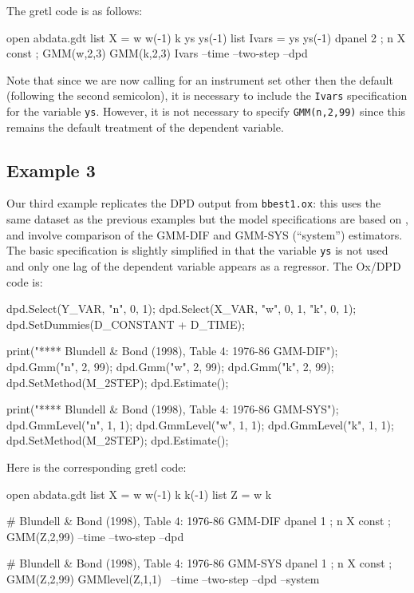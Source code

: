 The gretl code is as follows:

\begin{code}
open abdata.gdt
list X = w w(-1) k ys ys(-1)
list Ivars = ys ys(-1)
dpanel 2 ; n X const ; GMM(w,2,3) GMM(k,2,3) Ivars --time --two-step --dpd
\end{code}
%
Note that since we are now calling for an instrument set other then
the default (following the second semicolon), it is necessary to
include the \texttt{Ivars} specification for the variable \texttt{ys}.
However, it is not necessary to specify \texttt{GMM(n,2,99)} since
this remains the default treatment of the dependent variable.

\subsection{Example 3}

Our third example replicates the DPD output from \texttt{bbest1.ox}:
this uses the same dataset as the previous examples but the model
specifications are based on \cite{blundell-bond98}, and involve
comparison of the GMM-DIF and GMM-SYS (``system'') estimators. The
basic specification is slightly simplified in that the variable
\texttt{ys} is not used and only one lag of the dependent variable
appears as a regressor. The Ox/DPD code is:

\begin{code}
dpd.Select(Y_VAR, {"n", 0, 1});
dpd.Select(X_VAR, {"w", 0, 1, "k", 0, 1});
dpd.SetDummies(D_CONSTANT + D_TIME);

print("\n\n***** Blundell & Bond (1998), Table 4: 1976-86 GMM-DIF");
dpd.Gmm("n", 2, 99);
dpd.Gmm("w", 2, 99);
dpd.Gmm("k", 2, 99);
dpd.SetMethod(M_2STEP);
dpd.Estimate();

print("\n\n***** Blundell & Bond (1998), Table 4: 1976-86 GMM-SYS");
dpd.GmmLevel("n", 1, 1);
dpd.GmmLevel("w", 1, 1);
dpd.GmmLevel("k", 1, 1);
dpd.SetMethod(M_2STEP);
dpd.Estimate();
\end{code}

Here is the corresponding gretl code:

\begin{code}
open abdata.gdt
list X = w w(-1) k k(-1)
list Z = w k

# Blundell & Bond (1998), Table 4: 1976-86 GMM-DIF
dpanel 1 ; n X const ; GMM(Z,2,99) --time --two-step --dpd

# Blundell & Bond (1998), Table 4: 1976-86 GMM-SYS
dpanel 1 ; n X const ; GMM(Z,2,99) GMMlevel(Z,1,1) \
 --time --two-step --dpd --system
\end{code}

